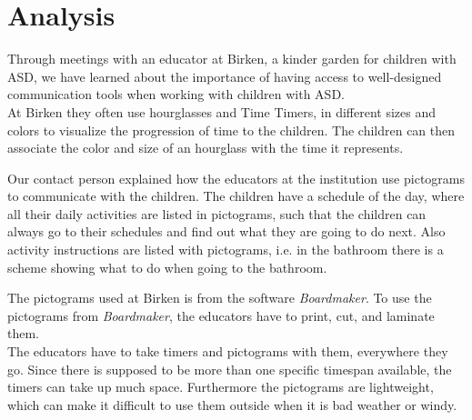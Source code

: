 \chapter{Analysis}
\label{cha:analysis}
Through meetings with an educator at Birken, a kinder garden for children with ASD, we have learned about the importance of having access to well-designed communication tools when working with children with ASD.\\

At Birken they often use hourglasses and Time Timers, in different sizes and colors to visualize the progression of time to the children. The children can then associate the color and size of an hourglass with the time it represents.

Our contact person explained how the educators at the institution use pictograms to communicate with the children. The children have a schedule of the day, where all their daily activities are listed in pictograms, such that the children can always go to their schedules and find out what they are going to do next. Also activity instructions are listed with pictograms, i.e. in the bathroom there is a scheme showing what to do when going to the bathroom.

The pictograms used at Birken is from the software \textit{Boardmaker}\cite{web:boardmaker}. To use the pictograms from \textit{Boardmaker}, the educators have to print, cut, and laminate them.\\

The educators have to take timers and pictograms with them, everywhere they go. Since there is supposed to be more than one specific timespan available, the timers can take up much space. Furthermore the pictograms are lightweight, which can make it difficult to use them outside when it is bad weather or windy.